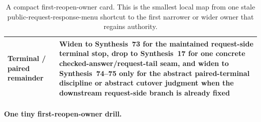 \documentclass[11pt]{article}
\begin{document}
\begin{table}[t]
\begin{tabularx}{\linewidth}{@{}lX@{}}
Terminal / paired remainder & Widen to \textbf{Synthesis~73} for the maintained request-side terminal stop, drop to \textbf{Synthesis~17} for one concrete checked-answer/request-tail seam, and widen to \textbf{Synthesis~74--75} only for the abstract paired-terminal discipline or abstract cutover judgment when the downstream request-side branch is already fixed \\
\bottomrule
\end{tabularx}
\caption{A compact first-reopen-owner card. This is the smallest local map from one stale public-request-response-menu shortcut to the first narrower or wider owner that regains authority.}
\label{tab:first-reopen-owner-card-public-request-response-menus}
\end{table}

\paragraph{One tiny first-reopen-owner drill.}
\end{document}
